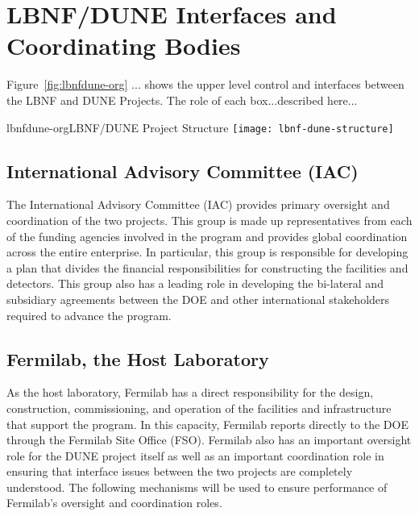 \section{LBNF/DUNE Interfaces and Coordinating Bodies}
\label{sec:lbnf-dune-interface}

Figure~\ref{fig:lbnfdune-org} ... shows the upper level control and interfaces between the LBNF and DUNE Projects.  The role of each box...described here... 

\begin{cdrfigure}{lbnfdune-org}{LBNF/DUNE Project Structure}
\texttt{[image: lbnf-dune-structure]}
\end{cdrfigure}

\subsection{International Advisory Committee (IAC) }

The International Advisory Committee (IAC) provides primary oversight and coordination of the two projects.  This group is made up representatives from each of the funding agencies involved in the program and provides global coordination across the entire enterprise.  In particular, this group is responsible for developing a plan that divides the financial responsibilities for constructing the facilities and detectors.   This group also has a leading role in developing the bi-lateral and subsidiary agreements between the DOE and other international stakeholders required to advance the program. 

\subsection{Fermilab, the Host Laboratory}

As the host laboratory, Fermilab has a direct responsibility for the design, construction, commissioning, and operation of the facilities and infrastructure that support the program.  In this capacity, Fermilab reports directly to the    DOE through the Fermilab Site Office (FSO).   Fermilab also has an important oversight role for the DUNE project itself as well as an important coordination role in ensuring that interface issues between the two projects are completely understood.  The following mechanisms will be used to ensure performance of Fermilab’s oversight and coordination roles. 

